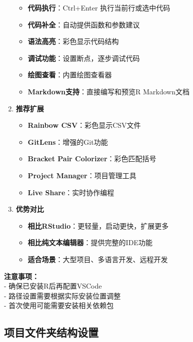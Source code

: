 \documentclass[
]{book}
\providecommand{\tightlist}{%
  \setlength{\itemsep}{0pt}\setlength{\parskip}{0pt}}
\begin{document}
\begin{enumerate}
  \begin{itemize}
  \tightlist
  \item
    \textbf{代码执行}：Ctrl+Enter 执行当前行或选中代码
  \item
    \textbf{代码补全}：自动提供函数和参数建议
  \item
    \textbf{语法高亮}：彩色显示代码结构
  \item
    \textbf{调试功能}：设置断点，逐步调试代码
  \item
    \textbf{绘图查看}：内置绘图查看器
  \item
    \textbf{Markdown支持}：直接编写和预览R Markdown文档
  \end{itemize}
\item
  \textbf{推荐扩展}

  \begin{itemize}
  \tightlist
  \item
    \textbf{Rainbow CSV}：彩色显示CSV文件
  \item
    \textbf{GitLens}：增强的Git功能
  \item
    \textbf{Bracket Pair Colorizer}：彩色匹配括号
  \item
    \textbf{Project Manager}：项目管理工具
  \item
    \textbf{Live Share}：实时协作编程
  \end{itemize}
\item
  \textbf{优势对比}

  \begin{itemize}
  \tightlist
  \item
    \textbf{相比RStudio}：更轻量，启动更快，扩展更多
  \item
    \textbf{相比纯文本编辑器}：提供完整的IDE功能
  \item
    \textbf{适合场景}：大型项目、多语言开发、远程开发
  \end{itemize}
\end{enumerate}

\textbf{注意事项：}\\
- 确保已安装R后再配置VSCode\\
- 路径设置需要根据实际安装位置调整\\
- 首次使用可能需要安装相关依赖包

\hypertarget{ux9879ux76eeux6587ux4ef6ux5939ux7ed3ux6784ux8bbeux7f6e}{%
\subsection{项目文件夹结构设置}\label{ux9879ux76eeux6587ux4ef6ux5939ux7ed3ux6784ux8bbeux7f6e}}
\end{document}

